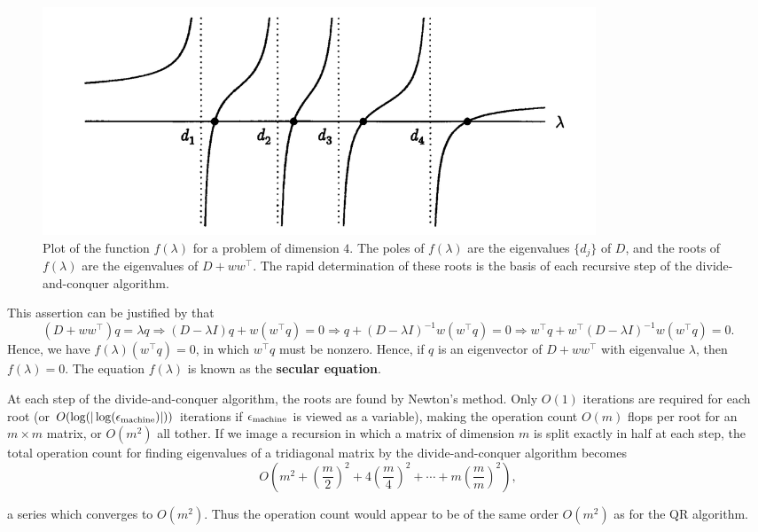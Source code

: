 \begin{figure}[H]
    \centering
    \includegraphics[width=0.8\textwidth]{figures/30-3.png}
    \caption{Plot of the function $ f(\lambda)$ for a problem of dimension $ 4 $. The poles of $ f(\lambda ) $ are the eigenvalues $ \{d_j\}  $ of $ D $, and the roots of $ f(\lambda ) $ are the eigenvalues of $ D+ww^\top  $. The rapid determination of these roots is the basis of each recursive step of the divide-and-conquer algorithm. }
\end{figure}

This assertion can be justified by that 
\[
    (D+ww^\top ) q = \lambda q \Rightarrow (D - \lambda I)q + w(w^\top q) =0 \Rightarrow q+(D-\lambda I)^{-1} w(w^\top q) =0 \Rightarrow w^\top q + w^\top (D-\lambda I)^{-1}  w(w^\top q) = 0. 
\]
Hence, we have $ f(\lambda ) (w^\top q) =0 $, in which $ w^\top q $ must be nonzero.  Hence, if $ q $ is an eigenvector of $ D+ww^\top  $ with eigenvalue $ \lambda  $, then $ f(\lambda )=0 $.  The equation $ f(\lambda ) $ is known as the \textbf{secular equation}.

At each step of the divide-and-conquer algorithm, the roots are found by Newton's method. Only $ O(1) $ iterations are required for each root (or $ O(\log(|\log(\epsilon_{\text{machine}})|)) $ iterations if $ \epsilon_{\text{machine}} $ is viewed as a variable), making the operation count $ O(m) $ flops per root for an $ m\times m $ matrix, or $ O(m^{2} ) $ all tother. If we image a recursion in which a matrix of  dimension $ m $ is split exactly in half at each step, the total operation count for finding eigenvalues of a tridiagonal matrix by the divide-and-conquer algorithm becomes
\begin{equation}
\label{eq: cost of conquer}
        O\left( m^{2}  + \left( \frac{m}{2} \right) ^{2}  + 4\left( \frac{m}{4} \right) ^{2}  +\cdots + m  \left( \frac{m}{m} \right) ^{2}  \right) ,
\end{equation}

a series which converges to $ O(m^{2} ) $. Thus the operation count would appear to be of the same order $ O(m^{2} ) $ as for the QR algorithm.  



